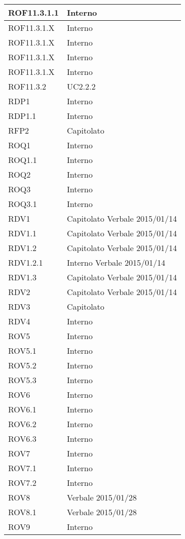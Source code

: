 \begin{center}
\begin{longtable}{| p{4cm} | p{4cm} |}
ROF11.3.1.1   &  Interno \\
\hline
ROF11.3.1.X   &  Interno \\
\hline
ROF11.3.1.X   &  Interno \\
\hline
ROF11.3.1.X   &  Interno \\
\hline
ROF11.3.1.X   &  Interno \\
\hline
ROF11.3.2   &  UC2.2.2 \\
\hline
RDP1   &  Interno \\
\hline
RDP1.1   &  Interno \\
\hline
RFP2   &  Capitolato \\
\hline
ROQ1   &  Interno \\
\hline
ROQ1.1   &  Interno \\
\hline
ROQ2   &  Interno \\
\hline
ROQ3   &  Interno \\
\hline
ROQ3.1   &  Interno \\
\hline
RDV1   &  Capitolato \newline Verbale 2015/01/14 \\
\hline
RDV1.1   &  Capitolato \newline Verbale 2015/01/14 \\
\hline
RDV1.2   &  Capitolato \newline Verbale 2015/01/14 \\
\hline
RDV1.2.1   &  Interno \newline Verbale 2015/01/14 \\
\hline
RDV1.3   &  Capitolato \newline Verbale 2015/01/14 \\
\hline
RDV2   &  Capitolato \newline Verbale 2015/01/14 \\
\hline
RDV3   &  Capitolato \\
\hline
RDV4   &  Interno \\
\hline
ROV5   &  Interno \\
\hline
ROV5.1   &  Interno \\
\hline
ROV5.2   &  Interno \\
\hline
ROV5.3   &  Interno \\
\hline
ROV6   &  Interno \\
\hline
ROV6.1   &  Interno \\
\hline
ROV6.2   &  Interno \\
\hline
ROV6.3   &  Interno \\
\hline
ROV7   &  Interno \\
\hline
ROV7.1   &  Interno \\
\hline
ROV7.2   &  Interno \\
\hline
ROV8   &  Verbale 2015/01/28 \\
\hline
ROV8.1   &  Verbale 2015/01/28 \\
\hline
ROV9   &  Interno \\
\hline
\end{longtable}
\egroup
\end{center}
